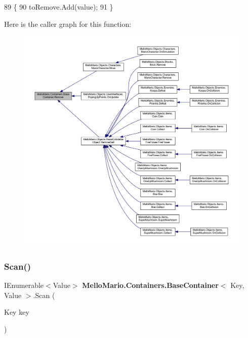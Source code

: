 \begin{DoxyCode}
89         \{
90             toRemove.Add(value);
91         \}
\end{DoxyCode}
Here is the caller graph for this function\+:
\nopagebreak
\begin{figure}[H]
\begin{center}
\leavevmode
\includegraphics[width=350pt]{classMelloMario_1_1Containers_1_1BaseContainer_a22d1d351d72889669184260796158208_icgraph}
\end{center}
\end{figure}
\mbox{\label{classMelloMario_1_1Containers_1_1BaseContainer_ab2746816cefc64fdadac94ac31eaea47}} 
\subsubsection{Scan()}
{\footnotesize\ttfamily I\+Enumerable$<$Value$>$ \textbf{ Mello\+Mario.\+Containers.\+Base\+Container}$<$ Key, Value $>$.Scan (\begin{DoxyParamCaption}\item[{Key}]{key }\end{DoxyParamCaption})\hspace{0.3cm}{\ttfamily [protected]}}



